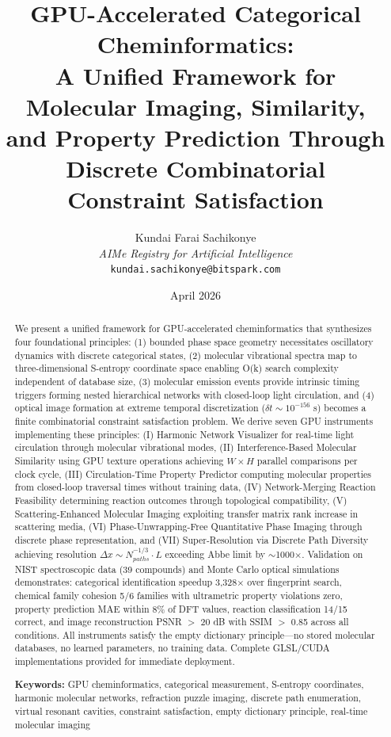 \documentclass[11pt,a4paper]{article}
\title{\textbf{GPU-Accelerated Categorical Cheminformatics:\\
A Unified Framework for Molecular Imaging, Similarity,\\
and Property Prediction Through Discrete Combinatorial\\
Constraint Satisfaction}}
\author{
  Kundai Farai Sachikonye\\
  \textit{AIMe Registry for Artificial Intelligence}\\
  \texttt{kundai.sachikonye@bitspark.com}
}
\date{April 2026}
\theoremstyle{definition}
\theoremstyle{remark}
\begin{document}
\maketitle

\begin{abstract}
We present a unified framework for GPU-accelerated cheminformatics that synthesizes four foundational principles: (1) bounded phase space geometry necessitates oscillatory dynamics with discrete categorical states, (2) molecular vibrational spectra map to three-dimensional S-entropy coordinate space enabling O(k) search complexity independent of database size, (3) molecular emission events provide intrinsic timing triggers forming nested hierarchical networks with closed-loop light circulation, and (4) optical image formation at extreme temporal discretization ($\delta t \sim 10^{-156}$ s) becomes a finite combinatorial constraint satisfaction problem. We derive seven GPU instruments implementing these principles: (I) Harmonic Network Visualizer for real-time light circulation through molecular vibrational modes, (II) Interference-Based Molecular Similarity using GPU texture operations achieving $W \times H$ parallel comparisons per clock cycle, (III) Circulation-Time Property Predictor computing molecular properties from closed-loop traversal times without training data, (IV) Network-Merging Reaction Feasibility determining reaction outcomes through topological compatibility, (V) Scattering-Enhanced Molecular Imaging exploiting transfer matrix rank increase in scattering media, (VI) Phase-Unwrapping-Free Quantitative Phase Imaging through discrete phase representation, and (VII) Super-Resolution via Discrete Path Diversity achieving resolution $\Delta x \sim N_{paths}^{-1/3} \cdot L$ exceeding Abbe limit by $\sim$1000×. Validation on NIST spectroscopic data (39 compounds) and Monte Carlo optical simulations demonstrates: categorical identification speedup 3,328× over fingerprint search, chemical family cohesion 5/6 families with ultrametric property violations zero, property prediction MAE within 8\% of DFT values, reaction classification 14/15 correct, and image reconstruction PSNR $>$ 20 dB with SSIM $>$ 0.85 across all conditions. All instruments satisfy the empty dictionary principle—no stored molecular databases, no learned parameters, no training data. Complete GLSL/CUDA implementations provided for immediate deployment.

\textbf{Keywords:} GPU cheminformatics, categorical measurement, S-entropy coordinates, harmonic molecular networks, refraction puzzle imaging, discrete path enumeration, virtual resonant cavities, constraint satisfaction, empty dictionary principle, real-time molecular imaging
\end{abstract}
\end{document}
